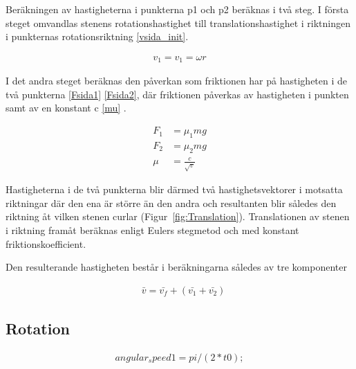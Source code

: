 \documentclass[11pt]{article} %
\begin{document}
Beräkningen av hastigheterna i punkterna p1 och p2 beräknas i två steg. I första steget omvandlas stenens rotationshastighet till translationshastighet i riktningen i punkternas rotationsriktning \eqref{vsida_init}. 
 
\begin{align}\label{vsida_init}
 v_1 = v_1 = \omega r
 \end{align}

I det andra steget beräknas den påverkan som friktionen har på hastigheten i de två punkterna \eqref{Fsida1} \eqref{Fsida2}, där friktionen påverkas av hastigheten i punkten samt av en konstant c \eqref{mu} . 

 \begin{align}\label{Fsida1}
 F_1& = \mu_1 mg\\\label{Fsida2}
F_2& = \mu_2 mg\\\label{mu}
\mu&=\frac{c}{\sqrt{v}}
 \end{align}

Hastigheterna i de två punkterna blir därmed två hastighetsvektorer i motsatta riktningar där den ena är större än den andra och resultanten blir således den riktning åt vilken stenen curlar (Figur~\ref{fig:Translation}). 
Translationen av stenen i riktning framåt beräknas enligt Eulers stegmetod och med konstant friktionskoefficient. 

Den resulterande hastigheten består i beräkningarna således av tre komponenter  %

 \begin{align}\label{vtot}
 &\bar{v}=\bar{v_f}+(\bar{v_1}+\bar{v_2})
 \end{align}

\subsection{Rotation}



\begin{align}%
 angular_speed1 = pi / (2*t0); 
 \end{align}
\end{document}
